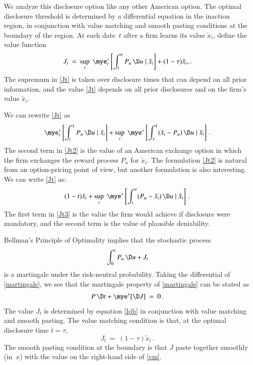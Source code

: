 \documentclass[authoryear,letterpaper,english,12pt]{elsarticle}
\begin{document}
We analyze this disclosure option like any other American option. The optimal disclosure threshold is determined by a differential equation in the inaction region, in conjunction with value matching and smooth pasting conditions at the boundary of the region.     At each date~$t$ after a firm learns its value $\tilde x_i$, define the value function
\begin{equation}\label{Jt}
J_t \ = \  \sup_\tau \; \mye^*_t \left[\int_t^\tau P_u \,\D u \mid \tilde x_i \right] + (1-\tau)\tilde x_i\\,.
\end{equation}
The supremum in \eqref{Jt} is taken over disclosure times that can depend on all prior information, and the value \eqref{Jt} depends on all prior disclosures and on the firm's value $\tilde x_i$.  

We can rewrite \eqref{Jt} as
\begin{equation}\label{Jt2}
\mye^*_t\left[ \int_t^1 P_u \,\D u \mid \tilde x_i \right] + \sup_\tau \; \mye^*\left[\int_\tau^1(\tilde x_i - P_u)\,\D u \mid \tilde x_i\right]\,.
\end{equation}
The second term in \eqref{Jt2} is the value of an American exchange option in which the firm exchanges the reward process $P_u$ for $\tilde x_i$.  The formulation \eqref{Jt2} is natural from an option-pricing point of view, but another formulation is also interesting.  We can  write \eqref{Jt} as:
\begin{equation}\label{Jt3}
(1-t)\tilde x_i + \sup_\tau \; \mye^*\left[\int_t^\tau (P_u-\tilde x_i )\,\D u\mid \tilde x_i\right]\,.
\end{equation}
The first term in \eqref{Jt3} is the value the firm would achieve if disclosure were mandatory, and the second term is the value of plausible deniability.

Bellman's Principle of Optimality implies that the stochastic process
\begin{equation}\label{martingale}
\int_0^t P_u\,\D u + J_t
\end{equation}
is a martingale under the risk-neutral probability.
Taking the differential of \eqref{martingale}, we see that the martingale property of \eqref{martingale} can be stated as
\begin{equation}\label{hjb}
P\,\D t + \mye^*[\D J] \ = \ 0\,.
\end{equation}
The value $J_t$ is determined by equation \eqref{hjb} in conjunction with value matching and smooth pasting. 
The value matching condition is that, at the optimal disclosure time $t=\tau$,
\begin{equation}\label{vm}
J_t \ = \ (1-\tau)\tilde x_i\,.
\end{equation} 
The smooth pasting condition at the boundary is that $J$ paste together smoothly (in~$x$) with the value on the right-hand side of \eqref{vm}. 
\end{document}
